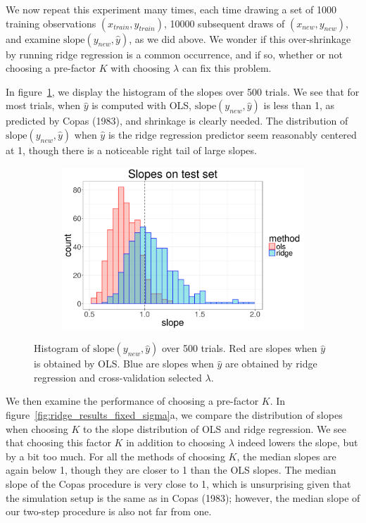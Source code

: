\documentclass[main]{subfiles}
\begin{document}
We now repeat this experiment many times, each time drawing a set of 1000 training observations
$(x_{train}, y_{train})$, 10000 subsequent draws of $(x_{new}, y_{new})$, and examine $\text{slope}(y_{new}, \hat y)$, as we did above.
We wonder if this over-shrinkage by running ridge regression is a common occurrence, and if so,
whether or not choosing a pre-factor $K$ with choosing $\lambda$ can fix this problem.

In figure~\ref{fig:ridge_slope_histogram}, we display the histogram of the slopes over 500 trials. We see that for most trials, when
$\hat y$ is computed with OLS,
$\text{slope}(y_{new}, \hat y)$ is less than 1, as predicted by Copas (1983), and shrinkage is clearly needed. The distribution
of $\text{slope}(y_{new}, \hat y)$ when $\hat y$ is the ridge regression predictor seem reasonably centered at 1,
though there is a noticeable right tail of large slopes.

\begin{figure}[!h]
	\centering
	\begin{subfigure}[t]{0.45\textwidth}
		\includegraphics[width = \textwidth]{./ridge_figures/slope_distr_hist_sigma50.png}
	\end{subfigure}
  \caption{Histogram of $\text{slope}(y_{new}, \hat y)$ over 500 trials. Red are slopes when $\hat y$ is obtained by OLS. Blue
  are slopes when $\hat y$ are obtained by ridge regression and cross-validation selected $\lambda$. }
  \label{fig:ridge_slope_histogram}
\end{figure}

We then examine the performance of choosing a pre-factor $K$.
In figure~\ref{fig:ridge_results_fixed_sigma}a, we compare the distribution of slopes when choosing $K$
to the slope distribution
of OLS and ridge regression. We see that choosing this factor $K$ in addition to choosing $\lambda$ indeed lowers
the slope, but by a bit too much. For all the methods of choosing $K$, the median slopes are again below 1,
though they are closer to 1 than the OLS slopes. The median slope of the Copas procedure is very close to 1,
which is unsurprising given that the simulation setup is the same as in Copas (1983); however, the median slope of our
two-step procedure is also not far from one.
\end{document}
